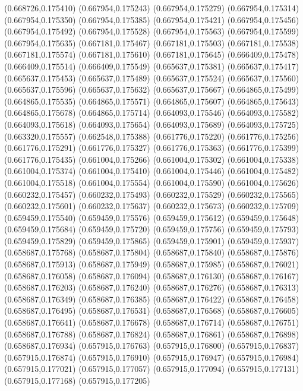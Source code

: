 (0.668726,0.175410)
(0.667954,0.175243)
(0.667954,0.175279)
(0.667954,0.175314)
(0.667954,0.175350)
(0.667954,0.175385)
(0.667954,0.175421)
(0.667954,0.175456)
(0.667954,0.175492)
(0.667954,0.175528)
(0.667954,0.175563)
(0.667954,0.175599)
(0.667954,0.175635)
(0.667181,0.175467)
(0.667181,0.175503)
(0.667181,0.175538)
(0.667181,0.175574)
(0.667181,0.175610)
(0.667181,0.175645)
(0.666409,0.175478)
(0.666409,0.175514)
(0.666409,0.175549)
(0.665637,0.175381)
(0.665637,0.175417)
(0.665637,0.175453)
(0.665637,0.175489)
(0.665637,0.175524)
(0.665637,0.175560)
(0.665637,0.175596)
(0.665637,0.175632)
(0.665637,0.175667)
(0.664865,0.175499)
(0.664865,0.175535)
(0.664865,0.175571)
(0.664865,0.175607)
(0.664865,0.175643)
(0.664865,0.175678)
(0.664865,0.175714)
(0.664093,0.175546)
(0.664093,0.175582)
(0.664093,0.175618)
(0.664093,0.175654)
(0.664093,0.175689)
(0.664093,0.175725)
(0.663320,0.175557)
(0.662548,0.175388)
(0.661776,0.175220)
(0.661776,0.175256)
(0.661776,0.175291)
(0.661776,0.175327)
(0.661776,0.175363)
(0.661776,0.175399)
(0.661776,0.175435)
(0.661004,0.175266)
(0.661004,0.175302)
(0.661004,0.175338)
(0.661004,0.175374)
(0.661004,0.175410)
(0.661004,0.175446)
(0.661004,0.175482)
(0.661004,0.175518)
(0.661004,0.175554)
(0.661004,0.175590)
(0.661004,0.175626)
(0.660232,0.175457)
(0.660232,0.175493)
(0.660232,0.175529)
(0.660232,0.175565)
(0.660232,0.175601)
(0.660232,0.175637)
(0.660232,0.175673)
(0.660232,0.175709)
(0.659459,0.175540)
(0.659459,0.175576)
(0.659459,0.175612)
(0.659459,0.175648)
(0.659459,0.175684)
(0.659459,0.175720)
(0.659459,0.175756)
(0.659459,0.175793)
(0.659459,0.175829)
(0.659459,0.175865)
(0.659459,0.175901)
(0.659459,0.175937)
(0.658687,0.175768)
(0.658687,0.175804)
(0.658687,0.175840)
(0.658687,0.175876)
(0.658687,0.175913)
(0.658687,0.175949)
(0.658687,0.175985)
(0.658687,0.176021)
(0.658687,0.176058)
(0.658687,0.176094)
(0.658687,0.176130)
(0.658687,0.176167)
(0.658687,0.176203)
(0.658687,0.176240)
(0.658687,0.176276)
(0.658687,0.176313)
(0.658687,0.176349)
(0.658687,0.176385)
(0.658687,0.176422)
(0.658687,0.176458)
(0.658687,0.176495)
(0.658687,0.176531)
(0.658687,0.176568)
(0.658687,0.176605)
(0.658687,0.176641)
(0.658687,0.176678)
(0.658687,0.176714)
(0.658687,0.176751)
(0.658687,0.176788)
(0.658687,0.176824)
(0.658687,0.176861)
(0.658687,0.176898)
(0.658687,0.176934)
(0.657915,0.176763)
(0.657915,0.176800)
(0.657915,0.176837)
(0.657915,0.176874)
(0.657915,0.176910)
(0.657915,0.176947)
(0.657915,0.176984)
(0.657915,0.177021)
(0.657915,0.177057)
(0.657915,0.177094)
(0.657915,0.177131)
(0.657915,0.177168)
(0.657915,0.177205)
